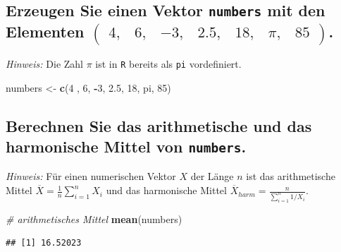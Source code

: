 \documentclass[12pt,a4paper]{article}
\newenvironment{Shaded}{\begin{snugshade}}{\end{snugshade}}
\newcommand{\CommentTok}[1]{\textcolor[rgb]{0.56,0.35,0.01}{\textit{#1}}}
\newcommand{\DecValTok}[1]{\textcolor[rgb]{0.00,0.00,0.81}{#1}}
\newcommand{\FloatTok}[1]{\textcolor[rgb]{0.00,0.00,0.81}{#1}}
\newcommand{\FunctionTok}[1]{\textcolor[rgb]{0.13,0.29,0.53}{\textbf{#1}}}
\newcommand{\NormalTok}[1]{#1}
\newcommand{\OtherTok}[1]{\textcolor[rgb]{0.56,0.35,0.01}{#1}}
\newcommand{\SpecialCharTok}[1]{\textcolor[rgb]{0.81,0.36,0.00}{\textbf{#1}}}
\begin{document}
\subsection{\texorpdfstring{Erzeugen Sie einen Vektor \texttt{numbers}
mit den Elementen
\(\begin{pmatrix} 4, & 6, & -3, & 2.5, & 18, & \pi, &  85 \end{pmatrix}\).}{Erzeugen Sie einen Vektor  mit den Elementen \textbackslash begin\{pmatrix\} 4, \& 6, \& -3, \& 2.5, \& 18, \& \textbackslash pi, \&  85 \textbackslash end\{pmatrix\}.}}\label{erzeugen-sie-einen-vektor-mit-den-elementen-beginpmatrix-4-6--3-2.5-18-pi-85-endpmatrix.}

\emph{Hinweis:} Die Zahl \(\pi\) ist in \texttt{R} bereits als
\texttt{pi} vordefiniert.

\begin{Shaded}
\begin{Highlighting}[]
\NormalTok{    numbers }\OtherTok{\textless{}{-}} \FunctionTok{c}\NormalTok{(}\DecValTok{4}\NormalTok{ , }\DecValTok{6}\NormalTok{, }\SpecialCharTok{{-}}\DecValTok{3}\NormalTok{, }\FloatTok{2.5}\NormalTok{, }\DecValTok{18}\NormalTok{, pi, }\DecValTok{85}\NormalTok{)}
\end{Highlighting}
\end{Shaded}

\vspace{0.5cm}

\subsection{\texorpdfstring{Berechnen Sie das arithmetische und das
harmonische Mittel von
\texttt{numbers}.}{Berechnen Sie das arithmetische und das harmonische Mittel von .}}\label{berechnen-sie-das-arithmetische-und-das-harmonische-mittel-von-.}

\emph{Hinweis:} Für einen numerischen Vektor \(X\) der Länge \(n\) ist
das arithmetische Mittel \(\overline{X} = \frac{1}{n} \sum_{i=1}^n X_i\)
und das harmonische Mittel
\(\overline{X}_{harm} = \frac{n}{\sum_{i=1}^n 1/X_i}\).

\begin{Shaded}
\begin{Highlighting}[]
    \CommentTok{\# arithmetisches Mittel}
    \FunctionTok{mean}\NormalTok{(numbers) }
\end{Highlighting}
\end{Shaded}

\begin{verbatim}
## [1] 16.52023
\end{verbatim}
\end{document}
